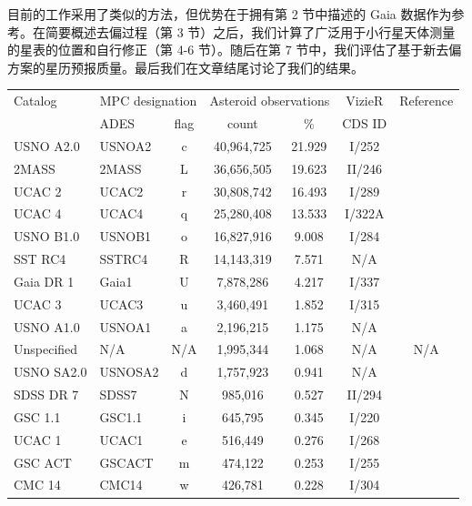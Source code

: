 \documentclass[review]{elsarticle}
\begin{document}
目前的工作采用了类似的方法，但优势在于拥有第 2 节中描述的 Gaia 数据作为参考。在简要概述去偏过程（第 3 节）之后，我们计算了广泛用于小行星天体测量的星表的位置和自行修正（第 4-6 节）。随后在第 7 节中，我们评估了基于新去偏方案的星历预报质量。最后我们在文章结尾讨论了我们的结果。
%
\begin{table}\tiny
\begin{center}
\begin{tabular}{llccccc}
\hline
Catalog & \multicolumn{2}{c}{MPC designation}  & \multicolumn{2}{c}{Asteroid observations} & VizieR & Reference\\
             & ADES  & flag & count &  \%   &  CDS ID &\\
\hline
USNO A2.0   & USNOA2  & c  & 40,964,725 & 21.929 & I/252   &\citet{usnoa2}\\
2MASS       & 2MASS  & L  & 36,656,505 & 19.623 &  II/246   & \citet{2mass}\\
UCAC 2      &  UCAC2 & r  & 30,808,742 & 16.493 & I/289    &\citet{ucac2}\\
UCAC 4      & UCAC4  & q  & 25,280,408 & 13.533 & I/322A       &\citet{ucac4}\\
USNO B1.0   & USNOB1  & o  & 16,827,916 & 9.008 & I/284       &\citet{usnob1}\\
SST RC4     &  SSTRC4 & R  & 14,143,319 & 7.571 & N/A       & \citet{sstrc5} \\
Gaia DR 1    & Gaia1  & U  & 7,878,286 & 4.217 & I/337         &\citet{gaiadr1}\\
UCAC 3      &  UCAC3 & u  & 3,460,491 & 1.852 & I/315         &\citet{ucac3}\\
USNO A1.0   & USNOA1 & a  & 2,196,215 & 1.175 & N/A         &\citet{usnoa1}\\
Unspecified     & N/A & N/A & 1,995,344 & 1.068 & N/A       &N/A\\
USNO SA2.0  & USNOSA2 & d  & 1,757,923 & 0.941 & N/A        &\citet{usnoa2}\\
SDSS DR 7    & SDSS7  & N  & 985,016 & 0.527 & II/294          &\citet{sdss7}\\
GSC 1.1     &  GSC1.1 & i  & 645,795 & 0.345 & I/220          &\citet{gsc1.1}\\
UCAC 1      & UCAC1  & e  & 516,449 & 0.276 &   I/268        &\citet{ucac1}\\
GSC ACT     & GSCACT  & m  & 474,122 & 0.253 & I/255         &\citet{gsc_act}\\
CMC 14      & CMC14  & w  & 426,781 & 0.228 & I/304          &\citet{cmc14}\\

\end{tabular}
\end{center}
\end{table}
\end{document}
